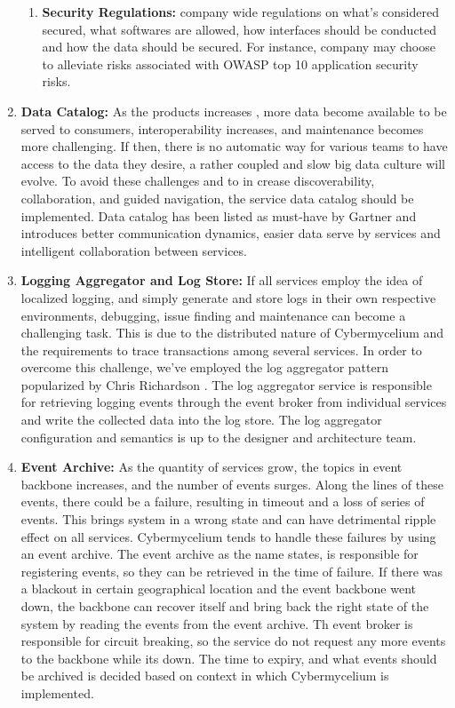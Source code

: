 \documentclass[review]{elsarticle}
\begin{document}
\begin{enumerate}
\begin{enumerate}
        \item \textbf{Security Regulations:} company wide regulations on what's considered secured, what softwares are allowed, how interfaces should be conducted and how the data should be secured. For instance, company may choose to alleviate risks associated with OWASP top 10 application security risks.
    \end{enumerate}
    \item \textbf{Data Catalog:} As the products increases , more data become available to be served to consumers, interoperability increases, and maintenance becomes more challenging. If then, there is no automatic way for various teams to have access to the data they desire, a rather coupled and slow big data culture will evolve. To avoid these challenges and to in crease discoverability, collaboration, and guided navigation, the service data catalog should be implemented. Data catalog has been listed as must-have by Gartner \cite{GartnerDataCatalog} and introduces better communication dynamics, easier data serve by services and intelligent collaboration between services. 
    \item \textbf{Logging Aggregator and Log Store:} If all services employ the idea of localized logging, and simply generate and store logs in their own respective environments, debugging, issue finding and maintenance can become a challenging task. This is due to the distributed nature of Cybermycelium and the requirements to trace transactions among several services. In order to overcome this challenge, we've employed the log aggregator pattern popularized by Chris Richardson \cite{MicroServicesPatterns}. The log aggregator service is responsible for retrieving logging events through the event broker from individual services and write the collected data into the log store. The log aggregator configuration and semantics is up to the designer and architecture team. 
    \item \textbf{Event Archive:} As the quantity of services grow, the topics in event backbone increases, and the number of events surges. Along the lines of these events, there could be a failure, resulting in timeout and a loss of series of events. This brings system in a wrong state and can have detrimental ripple effect on all services. Cybermycelium tends to handle these failures by using an event archive. The event archive as the name states, is responsible for registering events, so they can be retrieved in the time of failure. If there was a blackout in certain geographical location and the event backbone went down, the backbone can recover itself and bring back the right state of the system by reading the events from the event archive. Th event broker is responsible for circuit breaking, so the service do not request any more events to the backbone while its down. The time to expiry, and what events should be archived is decided based on context in which Cybermycelium is implemented.  

\end{enumerate}
\end{document}
